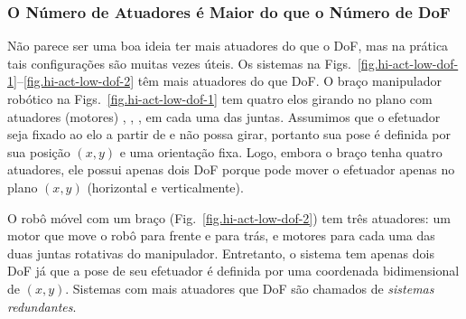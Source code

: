 \subsubsection*{O Número de Atuadores é Maior do que o Número de DoF}

Não parece ser uma boa ideia ter mais atuadores do que o DoF, mas na prática tais configurações são muitas vezes úteis. Os sistemas na Figs.~\ref{fig.hi-act-low-dof-1}--\ref{fig.hi-act-low-dof-2} têm mais atuadores do que DoF. O braço manipulador robótico na Figs.~\ref{fig.hi-act-low-dof-1} tem quatro elos girando no plano com atuadores (motores) , , ,  em cada uma das juntas. Assumimos que o efetuador seja fixado ao elo a partir de  e não possa girar, portanto sua pose é definida por sua posição $(x,y)$ e uma orientação fixa. Logo, embora o braço tenha quatro atuadores, ele possui apenas dois DoF porque pode mover o efetuador apenas no plano $(x,y)$ (horizontal e verticalmente).

O robô móvel com um braço (Fig.~\ref{fig.hi-act-low-dof-2}) tem três atuadores: um motor que move o robô para frente e para trás, e motores para cada uma das duas juntas rotativas do manipulador. Entretanto, o sistema tem apenas dois DoF já que a pose de seu efetuador é definida por uma coordenada bidimensional de $(x,y)$. Sistemas com mais atuadores que DoF são chamados de \emph{sistemas redundantes}.

